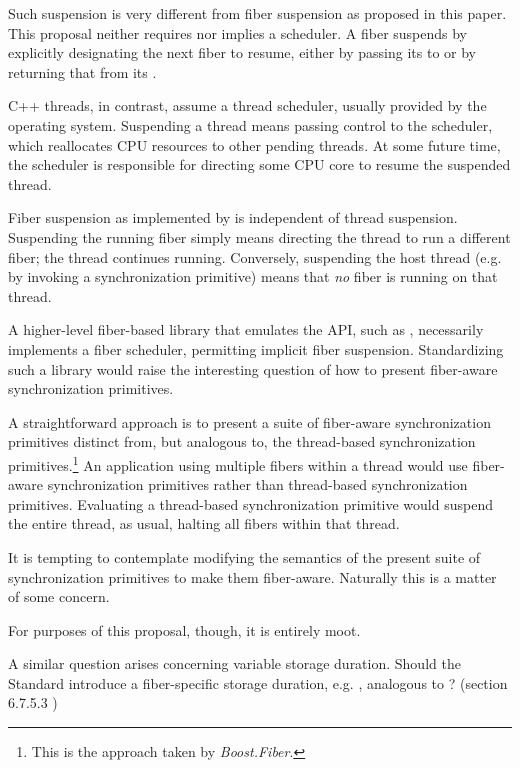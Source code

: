 Such suspension is very different from fiber suspension as proposed in this
paper. This proposal neither requires nor implies a scheduler. A fiber
suspends by explicitly designating the next fiber to resume, either by passing
its \fiber to \resumewith or by returning that \fiber from its \entryfn.

C++ threads, in contrast, assume a thread scheduler, usually provided by the
operating system. Suspending a thread means passing control to the scheduler,
which reallocates CPU resources to other pending threads. At some future time,
the scheduler is responsible for directing some CPU core to resume the suspended
thread.

Fiber suspension as implemented by \fiber is independent of thread suspension.
Suspending the running fiber simply means directing the thread to run a
different fiber; the thread continues running. Conversely, suspending the host
thread (e.g. by invoking a synchronization primitive) means that \emph{no}
fiber is running on that thread.

A higher-level fiber-based library that emulates the  API,
such as \bfiber\cite{bfiber}, necessarily implements a fiber scheduler,
permitting implicit fiber suspension. Standardizing such a library would raise
the interesting question of how to present fiber-aware synchronization
primitives.

A straightforward approach is to present a suite of fiber-aware
synchronization primitives distinct from, but analogous to, the thread-based
synchronization primitives.\footnote{This is the approach taken
by \emph{Boost.Fiber}.} An application using multiple fibers within a thread
would use fiber-aware synchronization primitives rather than thread-based
synchronization primitives. Evaluating a thread-based synchronization
primitive would suspend the entire thread, as usual, halting all fibers within
that thread.

It is tempting to contemplate modifying the semantics of the present suite of
synchronization primitives to make them fiber-aware. Naturally this is a
matter of some concern.

For purposes of this \fiber proposal, though, it is entirely moot.


A similar question arises concerning variable storage duration. Should the
Standard introduce a fiber-specific storage duration, e.g. ,
analogous to \cite{Standard}? (section 6.7.5.3 )

